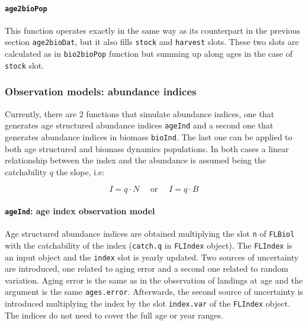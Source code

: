 \paragraph{\texttt{age2bioPop}} \hspace{0pt} \smallskip

	This function operates exactly in the same way as its counterpart in the previous section \texttt{age2bioDat}, 
	but it also fills \texttt{stock} and  \texttt{harvest} slots. These two slots are calculated as in 
	\texttt{bio2bioPop} function but summing up along ages in the case of \texttt{stock} slot.


\subsubsection{Observation models: abundance indices}

	Currently, there are 2 functions that simulate abundance indices, one that generates age structured abundance indices 
	\texttt{ageInd} and a second one that generates abundance indices in biomass \texttt{bioInd}. The last one can 
	be applied to both age structured and biomass dynamics populations. In both cases a linear relationship between 
	the index and the abundance is assumed being the catchability $q$ the slope, i.e:

		$$ I = q\cdot N \quad \text{ or } \quad I =q\cdot B$$ 
	
	\paragraph{\texttt{ageInd}: age index observation model} \hspace{0pt} \smallskip

	Age structured abundance indices are obtained multiplying 
	the slot \texttt{n} of \texttt{FLBiol} with the catchability of the 
	index (\texttt{catch.q} in \texttt{FLIndex} object). The \texttt{FLIndex} is an input 
	object and the \texttt{index} slot is yearly updated. Two sources of uncertainty are introduced, one
	related to aging error and a second one related to random variation. Aging error is the
	same as in the observation of landings at age and the argument is the same \texttt{ages.error}. 
	Afterwards, the second source of uncertainty is introduced multiplying the index by the slot
	\texttt{index.var} of the \texttt{FLIndex} object. The indices do not need to cover the full age or year ranges.

